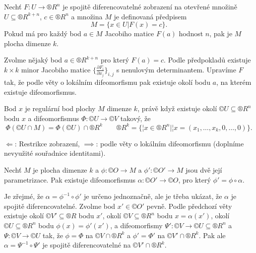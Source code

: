 \documentclass[12pt]{article}                   %
\begin{document}
        \begin{veta}
            Nechť $F: U \rightarrow ®R^n$ je spojitě diferencovatelné zobrazení na otevřené množině $U \subseteq ®R^{k + n}$, $c \in ®R^n$ a množina $M$ je definovaná předpisem
            $$ M = \{x \in U | F(x) = c\}. $$
            Pokud má pro každý bod $a \in M$ Jacobiho matice $F(a)$ hodnost $n$, pak je $M$ plocha dimenze $k$.

            \begin{dukazin}
                Zvolme nějaký bod $a \in ®R^{k+n}$ pro který $F(a) = c$. Podle předpokladů existuje $k \times k$ minor Jacobiho matice $\{\frac{\partial F_i}{\partial x_j}\}_{i,j}$ s nenulovým determinantem. Upravíme $F$ tak, že podle věty o lokálním difeomorfismu pak existuje okolí bodu $a$, na kterém existuje difeomorfismus.
            \end{dukazin}
        \end{veta}

        \begin{veta}
            Bod $x$ je regulární bod plochy $M$ dimenze $k$, právě když existuje okolí $©U \subseteq ®R^n$ bodu $x$ a difeomorfismus $\Phi: ©U \rightarrow ©V$ takový, že
            $$ \Phi(©U \cap M) = \Phi(©U) \cap ®R^k \qquad ®R^k = \{¦x \in ®R^n | ¦x = (x_1, …, x_k, 0, …, 0)\}. $$

            \begin{dukazin}
                $\Leftarrow$: Restrikce zobrazení, $\implies$: podle věty o lokálním difeomorfismu (doplníme nevyužité souřadnice identitami).
            \end{dukazin}
        \end{veta}

        \begin{lemma}
            Nechť $M$ je plocha dimenze $k$ a $\phi: ©O \rightarrow M$ a $\phi': ©O' \rightarrow M$ jsou dvě její parametrizace. Pak existuje difeomorfismus $\alpha: ©O' \rightarrow ©O$, pro který $\phi' = \phi \circ \alpha$.

            \begin{dukazin}
                Je zřejmé, že $\alpha = \phi^{-1} \circ \phi'$ je určeno jednoznačně, ale je třeba ukázat, že $\alpha$ je spojitě diferencovatelné. Zvolme bod $x' \in ©O'$ pevně. Podle předchozí věty existuje okolí $©V' \subseteq ®R$ bodu $x'$, okolí $©V \subseteq ®R^n$ bodu $x = \alpha(x')$, okolí $©U \subseteq ®R^n$ bodu $\phi(x) = \phi'(x')$, a difeomorfismy $\Psi': ©V \rightarrow ©U \subseteq ®R^n$ a $\Psi: ©V \rightarrow ©U$ tak, že $\phi = \Phi$ na $©V \cap ®R^k$ a $\phi' = \Phi'$ na $©V' \cap ®R^k$. Pak ale $\alpha = \Psi^{-1} \circ \Psi'$ je spojitě diferencovatelné na $©V' \cap ®R^k$.
            \end{dukazin}
        \end{lemma}
\end{document}
